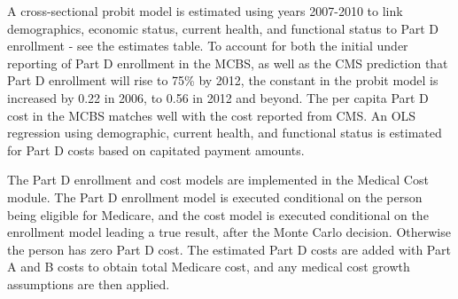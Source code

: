 A cross-sectional probit model is estimated using years 2007-2010 to link demographics, economic status, current health, and 
functional status to Part D enrollment - see the estimates table. To account for both the initial under reporting of Part D 
enrollment in the MCBS, as well as the CMS prediction that Part D enrollment will rise to 75\% by 2012, the constant in the probit model is 
increased by 0.22 in 2006, to 0.56 in 2012 and beyond.  The per capita Part D cost in the MCBS matches well with the cost reported from 
CMS. An OLS regression using demographic, current health, and functional status is estimated for Part D costs based on capitated payment amounts.

The Part D enrollment and cost models are implemented in the Medical Cost module. The Part D enrollment model is executed conditional on 
the person being eligible for Medicare, and the cost model is executed conditional on the enrollment model leading a true result, after the 
Monte Carlo decision. Otherwise the person has zero Part D cost. The estimated Part D costs are added with Part A and B costs to obtain 
total Medicare cost, and any medical cost growth assumptions are then applied.

